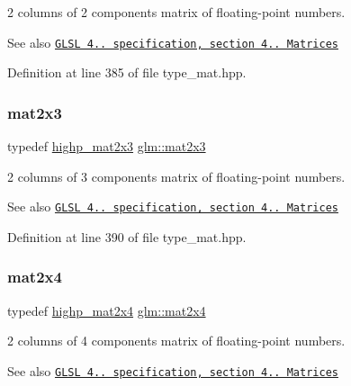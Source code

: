 2 columns of 2 components matrix of floating-\/point numbers.

\begin{DoxySeeAlso}{See also}
\href{http://www.opengl.org/registry/doc/GLSLangSpec.4.20.8.pdf}{\tt G\+L\+SL 4.. specification, section 4.. Matrices} 
\end{DoxySeeAlso}


Definition at line 385 of file type\+\_\+mat.\+hpp.

\mbox{\label{group__core__types_gaea02797b8231f6dd9380345f6ff12155}} 
\subsubsection{\texorpdfstring{mat2x3}{mat2x3}}
{\footnotesize\ttfamily typedef \hyperlink{group__core__precision_ga7d4e5a1c803be5688c75241c924dfa58}{highp\+\_\+mat2x3} \hyperlink{group__core__types_gaea02797b8231f6dd9380345f6ff12155}{glm\+::mat2x3}}

2 columns of 3 components matrix of floating-\/point numbers.

\begin{DoxySeeAlso}{See also}
\href{http://www.opengl.org/registry/doc/GLSLangSpec.4.20.8.pdf}{\tt G\+L\+SL 4.. specification, section 4.. Matrices} 
\end{DoxySeeAlso}


Definition at line 390 of file type\+\_\+mat.\+hpp.

\mbox{\label{group__core__types_gaa9bfb36efaf88ecad32369ec8a01d901}} 
\subsubsection{\texorpdfstring{mat2x4}{mat2x4}}
{\footnotesize\ttfamily typedef \hyperlink{group__core__precision_ga3cc506666b7a95db56f9d2eb787b6e20}{highp\+\_\+mat2x4} \hyperlink{group__core__types_gaa9bfb36efaf88ecad32369ec8a01d901}{glm\+::mat2x4}}

2 columns of 4 components matrix of floating-\/point numbers.

\begin{DoxySeeAlso}{See also}
\href{http://www.opengl.org/registry/doc/GLSLangSpec.4.20.8.pdf}{\tt G\+L\+SL 4.. specification, section 4.. Matrices} 
\end{DoxySeeAlso}


